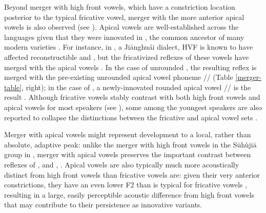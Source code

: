 \documentclass[output=paper,hidelinks]{langscibook}
\begin{document}
Beyond merger with high front vowels, which have a constriction location posterior to the typical fricative vowel, merger with the more anterior apical vowels is also observed (see ). Apical vowels are well-established across the  languages \citep{zee-icphs} given that they were innovated in  , the common ancestor of many modern varieties \citep{chen-middle, yu-aero}. For instance, in , a Ji\={a}nghu\'{a}i  dialect, HVF is known to have affected reconstructible \pri{} and \pry{}, but the fricativized reflexes of these vowels have merged with the apical vowels \citep{wu-hefei}. In the case of unrounded \pri{}, the resulting reflex is merged with the pre-existing unrounded apical vowel phoneme /\zz{}/ (Table \ref{merger-table}, right); in the case of \pry{}, a newly-innovated rounded apical vowel /\zw{}/ is the result \citep{wu-hefei, hou-hefei}.
%
Although fricative vowels stably contrast with both high front vowels and apical vowels for most \SC{} speakers (see ), some among the youngest \SC{} speakers are also reported to collapse the distinctions between the fricative and apical vowel sets \citep{li-suzhou, wang-suzhou}.


Merger with apical vowels might represent development to a local, rather than absolute, adaptive peak: unlike the merger with high front vowels in the S\=uh\`uji\=a group in \THW{}, merger with apical vowels preserves the important contrast between reflexes of \pri{}, \prien{} and  \pry{}, \pryen{}. Apical vowels are also typically much more acoustically distinct from high front vowels than fricative vowels are: given their very anterior constrictions, they have an even lower F2 than is typical for fricative vowels \citep[46--53]{ling-phd}, resulting in a large, easily perceptible acoustic difference from high front vowels that may contribute to their persistence as innovative variants.
\end{document}
